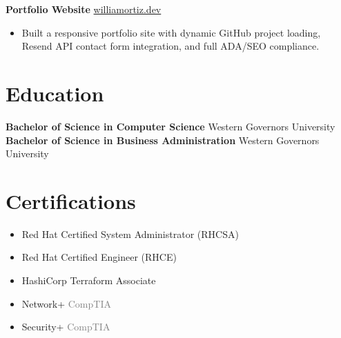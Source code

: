 \documentclass[11pt,letterpaper]{article}
\begin{document}
\textbf{Portfolio Website} \hfill \href{https://williamortiz.dev}{williamortiz.dev}
\begin{itemize}
    \item Built a responsive portfolio site with dynamic GitHub project loading, Resend API contact form integration, and full ADA/SEO compliance.
\end{itemize}


\section{Education}

\textbf{Bachelor of Science in Computer Science} \hfill Western Governors University \\
\textbf{Bachelor of Science in Business Administration} \hfill Western Governors University

\section{Certifications}

\begin{itemize}
    \item Red Hat Certified System Administrator (RHCSA)
    \item Red Hat Certified Engineer (RHCE)
    \item HashiCorp Terraform Associate
    \item Network+ \hfill \textcolor{graytext}{CompTIA}
    \item Security+ \hfill \textcolor{graytext}{CompTIA}
\end{itemize}
\end{document}
